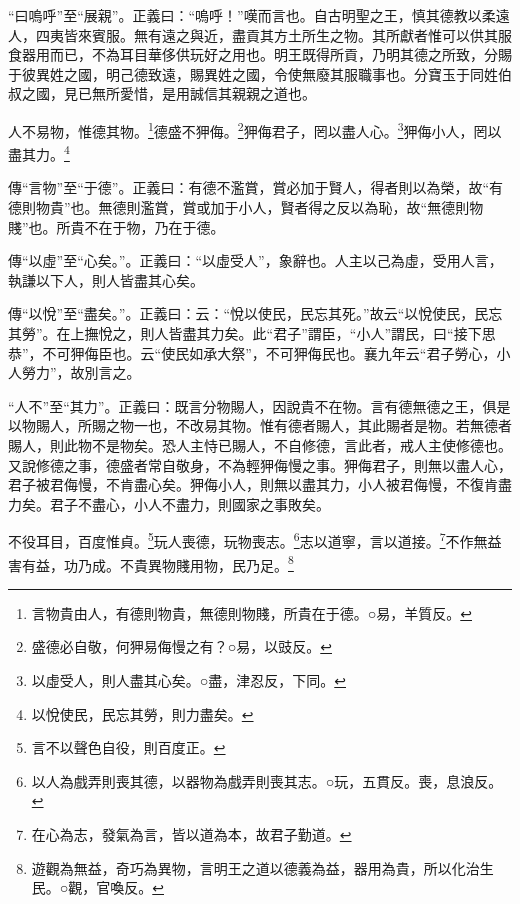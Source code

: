{\noindent\shu{}\fzkt “曰嗚呼”至“展親”。正義曰：“嗚呼！”嘆而言也。自古明聖之王，慎其德教以柔遠人，四夷皆來賓服。無有遠之與近，盡貢其方土所生之物。其所獻者惟可以供其服食器用而已，不為耳目華侈供玩好之用也。明王既得所貢，乃明其德之所致，分賜于彼異姓之國，明己德致遠，賜異姓之國，令使無廢其服職事也。分寶玉于同姓伯叔之國，見已無所愛惜，是用誠信其親親之道也。 \par}

人不易物，惟德其物。\footnote{言物貴由人，有德則物貴，無德則物賤，所貴在于德。○易，羊質反。}德盛不狎侮。\footnote{盛德必自敬，何狎易侮慢之有？○易，以豉反。}狎侮君子，罔以盡人心。\footnote{以虛受人，則人盡其心矣。○盡，津忍反，下同。}狎侮小人，罔以盡其力。\footnote{以悅使民，民忘其勞，則力盡矣。}


{\noindent\zhuan{}\fzbyks 傳“言物”至“于德”。正義曰：有德不濫賞，賞必加于賢人，得者則以為榮，故“有德則物貴”也。無德則濫賞，賞或加于小人，賢者得之反以為恥，故“無德則物賤”也。所貴不在于物，乃在于德。 \par}

{\noindent\zhuan{}\fzbyks 傳“以虛”至“心矣。”。正義曰：“以虛受人”，象辭也。人主以己為虛，受用人言，執謙以下人，則人皆盡其心矣。 \par}

{\noindent\zhuan{}\fzbyks 傳“以悅”至“盡矣。”。正義曰：云：“悅以使民，民忘其死。”故云“以悅使民，民忘其勞”。在上撫悅之，則人皆盡其力矣。此“君子”謂臣，“小人”謂民，曰“接下思恭”，不可狎侮臣也。云“使民如承大祭”，不可狎侮民也。襄九年云“君子勞心，小人勞力”，故別言之。 \par}

{\noindent\shu{}\fzkt “人不”至“其力”。正義曰：既言分物賜人，因說貴不在物。言有德無德之王，俱是以物賜人，所賜之物一也，不改易其物。惟有德者賜人，其此賜者是物。若無德者賜人，則此物不是物矣。恐人主恃已賜人，不自修德，言此者，戒人主使修德也。又說修德之事，德盛者常自敬身，不為輕狎侮慢之事。狎侮君子，則無以盡人心，君子被君侮慢，不肯盡心矣。狎侮小人，則無以盡其力，小人被君侮慢，不復肯盡力矣。君子不盡心，小人不盡力，則國家之事敗矣。 \par}

不役耳目，百度惟貞。\footnote{言不以聲色自役，則百度正。}玩人喪德，玩物喪志。\footnote{以人為戲弄則喪其德，以器物為戲弄則喪其志。○玩，五貫反。喪，息浪反。}志以道寧，言以道接。\footnote{在心為志，發氣為言，皆以道為本，故君子勤道。}不作無益害有益，功乃成。不貴異物賤用物，民乃足。\footnote{遊觀為無益，奇巧為異物，言明王之道以德義為益，器用為貴，所以化治生民。○觀，官喚反。}



